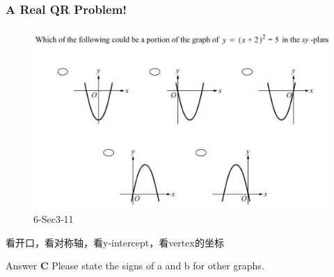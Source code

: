 \documentclass[
	11pt, %
	handout,
]{beamer}
\begin{document}
\begin{frame}
	\frametitle{A Real QR Problem!}
	\framesubtitle{}

	\begin{figure}
		\includegraphics[width=\linewidth]{Parabola_Example_Question1.png}
		\caption{6-Sec3-11}
	\end{figure}

	\pause

看开口，看对称轴，看y-intercept，看vertex的坐标 \\

\pause

\bigskip
Answer \textbf{C } \pause Please state the signs of a and b for other graphs.

\end{frame}

\end{document}
